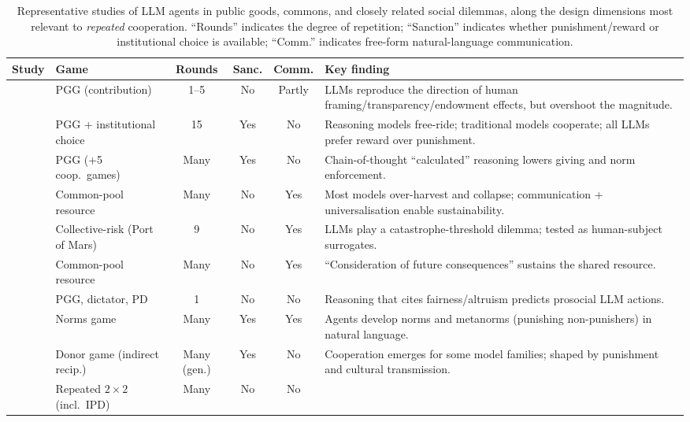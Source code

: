 \documentclass[11pt,a4paper]{article}
\begin{document}
\begin{table}[t]
\centering
\footnotesize
\caption{Representative studies of LLM agents in public goods, commons, and
closely related social dilemmas, along the design dimensions most relevant to
\emph{repeated} cooperation. ``Rounds'' indicates the degree of repetition;
``Sanction'' indicates whether punishment/reward or institutional choice is
available; ``Comm.'' indicates free-form natural-language communication.}
\label{tab:llm}
\begin{tabularx}{\textwidth}{@{}p{} p{} c c c Y@{}}
\toprule
\textbf{Study} & \textbf{Game} & \textbf{Rounds} & \textbf{Sanc.} &
\textbf{Comm.} & \textbf{Key finding} \\
\midrule
\citet{sreedhar2025simulating} & PGG (contribution) & 1--5 & No & Partly &
LLMs reproduce the direction of human framing/transparency/endowment effects, but
overshoot the magnitude. \\
\citet{guzman2025corrupted} & PGG + institutional choice & 15 & Yes & No &
Reasoning models free-ride; traditional models cooperate; all LLMs prefer reward
over punishment. \\
\citet{li2025spontaneous} & PGG (+5 coop.\ games) & Many & Yes & No &
Chain-of-thought ``calculated'' reasoning lowers giving and norm enforcement. \\
\citet{piatti2024govsim} & Common-pool resource & Many & No & Yes &
Most models over-harvest and collapse; communication + universalisation enable
sustainability. \\
\citet{slumbers2025port} & Collective-risk (Port of Mars) & 9 & No & Yes &
LLMs play a catastrophe-threshold dilemma; tested as human-subject surrogates. \\
\citet{nguyen2025navigating} & Common-pool resource & Many & No & Yes &
``Consideration of future consequences'' sustains the shared resource. \\
\citet{leng2023llmsocial} & PGG, dictator, PD & 1 & No & No &
Reasoning that cites fairness/altruism predicts prosocial LLM actions. \\
\citet{horiguchi2024evolution} & Norms game & Many & Yes & Yes &
Agents develop norms and metanorms (punishing non-punishers) in natural language. \\
\citet{vallinder2024cultural} & Donor game (indirect recip.) & Many (gen.) & Yes &
No & Cooperation emerges for some model families; shaped by punishment and cultural
transmission. \\
\citet{akata2025playing} & Repeated $2\times2$ (incl.\ IPD) & Many & No & No &

\end{tabularx}
\end{table}
\end{document}
